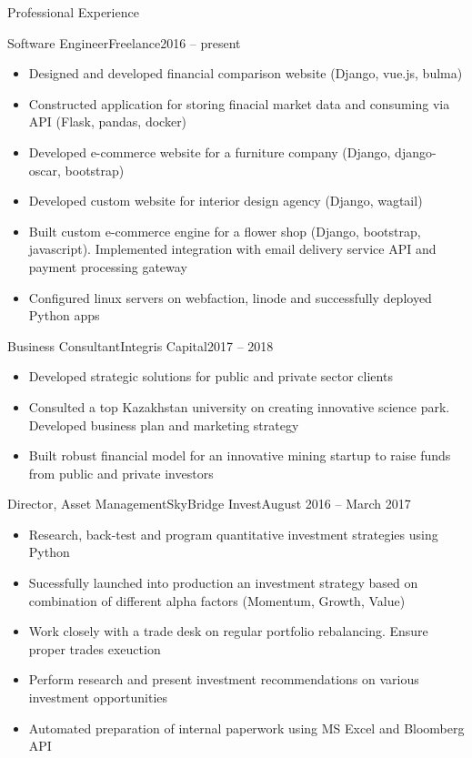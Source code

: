 \documentclass[]{mcdowellcv}
\begin{document}
\makeheader

\begin{cvsection}{Professional Experience}
  \begin{cvsubsection}{Software Engineer}{Freelance}{2016 -- present}
    \begin{itemize}
      \item Designed and developed financial comparison website (Django, vue.js, bulma)
      \item Constructed application for storing finacial market data and consuming via API (Flask, pandas, docker)
      \item Developed e-commerce website for a furniture company (Django, django-oscar, bootstrap)
      \item Developed custom website for interior design agency (Django, wagtail)
      \item Built custom e-commerce engine for a flower shop (Django, bootstrap, javascript). Implemented integration with email delivery service API and payment processing gateway
      \item Configured linux servers on webfaction, linode and successfully deployed Python apps
    \end{itemize}
  \end{cvsubsection}

  \begin{cvsubsection}{Business Consultant}{Integris Capital}{2017 -- 2018}	
    \begin{itemize}
      \item Developed strategic solutions for public and private sector clients
      \item Consulted a top Kazakhstan university on creating innovative science park. Developed business plan and marketing strategy
      \item Built robust financial model for an innovative mining startup to raise funds from public and private investors
    \end{itemize}
  \end{cvsubsection}

  \begin{cvsubsection}{Director, Asset Management}{SkyBridge Invest}{August 2016 -- March 2017}		
    \begin{itemize}
      \item Research, back-test and program quantitative investment strategies using Python
      \item Sucessfully launched into production an investment strategy based on combination of different alpha factors (Momentum, Growth, Value)
      \item Work closely with a trade desk on regular portfolio rebalancing. Ensure proper trades exeuction
      \item Perform research and present investment recommendations on various investment opportunities
      \item Automated preparation of internal paperwork using MS Excel and Bloomberg API
    \end{itemize}
  \end{cvsubsection}


\end{cvsection}
\end{document}
